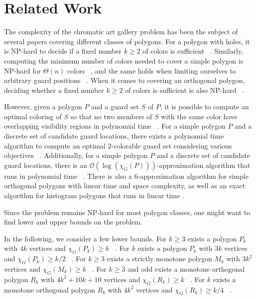 \section{Related Work}
The complexity of the chromatic art gallery problem has been the subject of several papers covering different classes of polygons.
For a polygon with holes, it is NP-hard to decide if a fixed number $k \geq 2$ of colors is sufficient ~\cite{fekete2014complexity}. Similarly, computing the minimum number of colors needed to cover a simple polygon is NP-hard for $\Theta(n)$ colors ~\cite{fekete2014complexity}, and the same holds when limiting ourselves to arbitrary guard positions ~\cite{fekete2014chromatic}. When it comes to covering an orthogonal polygon, deciding whether a fixed number $k \geq 2$ of colors is sufficient is also NP-hard ~\cite{hoorfar2021np}.\par\noindent
However, given a polygon $P$ and a guard set $S$ of $P$, it is possible to compute an optimal coloring of $S$ so that no two members of $S$ with the same color have overlapping visibility regions in polynomial time ~\cite{erickson2011many}. For a simple polygon $P$ and a discrete set of candidate guard locations, there exists a polynomial time algorithm to compute an optimal $2$-colorable guard set considering various objectives ~\cite{fekete2014chromatic}. Additionally, for a simple polygon $P$ and a discrete set of candidate guard locations, there is an $\mathcal{O}(\log (\chi_G(P)))$-approximation algorithm that runs in polynomial time ~\cite{fekete2014chromatic}. There is also a $6$-approximation algorithm for simple orthogonal polygons with linear time and space complexity, as well as an exact algorithm for histogram polygons that runs in linear time \cite{hoorfar2021np}.\par\noindent
Since the problem remains NP-hard for most polygon classes, one might want to find lower and upper bounds on the problem.\par\noindent
In the following, we consider a few lower bounds.
For $k \geq 3$ exists a polygon $P_k$ with $4k$ vertices and $\chi_G(P_k) \geq k$ ~\cite{erickson2012art}.
For $k$ exists a polygon $P_k$ with $3k$ vertices and $\chi_G(P_k) \geq k/2$ ~\cite{bartschi2011coloring}.
For $k \geq 3$ exists a strictly monotone polygon $M_k$ with $3k^2$ vertices and $\chi_G(M_k) \geq k$ ~\cite{erickson2012art}.
For $k \geq 3$ and odd exists a monotone orthogonal polygon $R_k$ with $4k^2 + 10k + 10$ vertices and $\chi_G(R_k) \geq k$ ~\cite{erickson2012art}.
For $k$ exists a monotone orthogonal polygon $R_k$ with $4k^2$ vertices and $\chi_G(R_k) \geq k/4$ ~\cite{bartschi2011coloring}.\par\noindent

